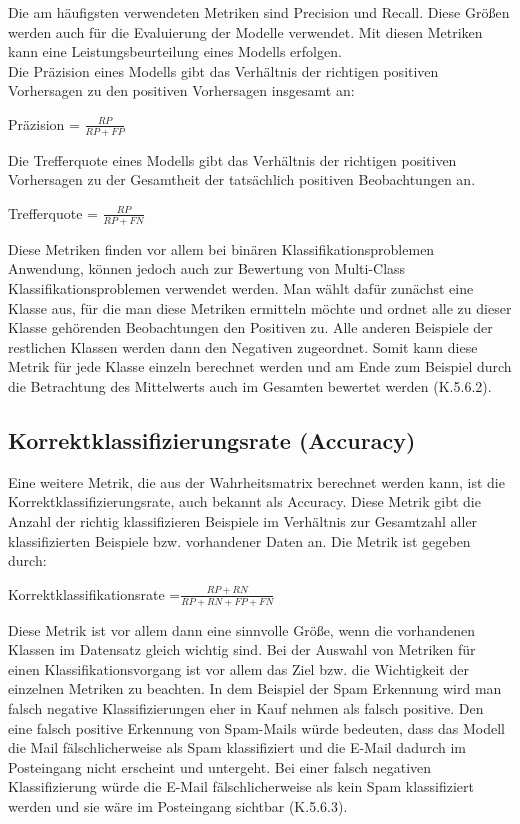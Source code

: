 \documentclass[12pt]{scrreprt}
\begin{document}
Die am häufigsten verwendeten Metriken sind Precision und Recall. Diese Größen werden auch für die Evaluierung der Modelle verwendet. Mit diesen Metriken kann eine Leistungsbeurteilung eines Modells erfolgen.  \\

Die Präzision eines Modells gibt das Verhältnis der richtigen positiven Vorhersagen zu den positiven Vorhersagen insgesamt an: 

\begin{center}
	Präzision = $\frac{RP}{RP + FP}$
\end{center}
 
Die Trefferquote eines Modells gibt das Verhältnis der richtigen positiven Vorhersagen zu der Gesamtheit der tatsächlich positiven Beobachtungen an.  

\begin{center}
	Trefferquote = $\frac{RP}{RP + FN}$
\end{center}

Diese Metriken finden vor allem bei binären Klassifikationsproblemen Anwendung, können jedoch auch zur Bewertung von Multi-Class Klassifikationsproblemen verwendet werden. Man wählt dafür zunächst eine Klasse aus, für die man diese Metriken ermitteln möchte und ordnet alle zu dieser Klasse gehörenden Beobachtungen den Positiven zu. Alle anderen Beispiele der restlichen Klassen werden dann den Negativen zugeordnet. Somit kann diese Metrik für jede Klasse einzeln berechnet werden und am Ende zum Beispiel durch die Betrachtung des Mittelwerts auch im Gesamten bewertet werden \cite{Burkov2019} (K.5.6.2).
	
\subsection{Korrektklassifizierungsrate (Accuracy) }
	
	Eine weitere Metrik, die aus der Wahrheitsmatrix berechnet werden kann, ist die Korrektklassifizierungsrate, auch bekannt als Accuracy. Diese Metrik gibt die Anzahl der richtig klassifizieren Beispiele im Verhältnis zur Gesamtzahl aller klassifizierten Beispiele bzw. vorhandener Daten an. Die Metrik ist gegeben durch:
	
\begin{center}
		Korrektklassifikationsrate  =$\frac{RP + RN}{RP + RN + FP + FN}$
\end{center}
	
Diese Metrik ist vor allem dann eine sinnvolle Größe, wenn die vorhandenen Klassen im Datensatz gleich wichtig sind. Bei der Auswahl von Metriken für einen Klassifikationsvorgang ist vor allem das Ziel bzw. die Wichtigkeit der einzelnen Metriken zu beachten. In dem Beispiel der Spam Erkennung wird man falsch negative Klassifizierungen eher in Kauf nehmen als falsch positive. Den eine falsch positive Erkennung von Spam-Mails würde bedeuten, dass das Modell die Mail fälschlicherweise als Spam klassifiziert und die E-Mail dadurch im Posteingang nicht erscheint und untergeht. Bei einer falsch negativen Klassifizierung würde die E-Mail fälschlicherweise als kein Spam klassifiziert werden und sie wäre im Posteingang sichtbar \cite{Burkov2019} (K.5.6.3).  
	
\end{document}
